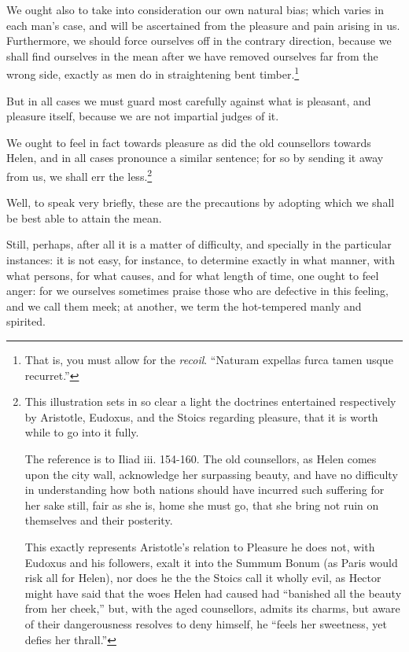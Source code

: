 We ought also to take into consideration our own natural bias; which varies in
each man’s case, and will be ascertained from the pleasure and pain
arising in us. Furthermore, we should force ourselves off in the contrary
direction, because we shall find ourselves in the mean after we have removed
ourselves far from the wrong side, exactly as men do in straightening bent
timber.\footnote{That is, you must allow for the \emph{recoil}. “Naturam expellas furca
tamen usque recurret.”}

But in all cases we must guard most carefully against what is pleasant, and
pleasure itself, because we are not impartial judges of it.

We ought to feel in fact towards pleasure as did the old counsellors towards
Helen, and in all cases pronounce a similar sentence; for so by sending it away
from us, we shall err the less.\footnote{This illustration sets in so clear a light the doctrines entertained
respectively by Aristotle, Eudoxus, and the Stoics regarding pleasure, that it
is worth while to go into it fully.

The reference is to Iliad iii. 154-160. The old counsellors, as Helen comes
upon the city wall, acknowledge her surpassing beauty, and have no difficulty
in understanding how both nations should have incurred such suffering for her
sake still, fair as she is, home she must go, that she bring not ruin on
themselves and their posterity.

This exactly represents Aristotle’s relation to Pleasure he does not,
with Eudoxus and his followers, exalt it into the Summum Bonum (as Paris would
risk all for Helen), nor does he the the Stoics call it wholly evil, as Hector
might have said that the woes Helen had caused had “banished all the
beauty from her cheek,” but, with the aged counsellors, admits its
charms, but aware of their dangerousness resolves to deny himself, he
“feels her sweetness, yet defies her thrall.”}

Well, to speak very briefly, these are the precautions by adopting which we
shall be best able to attain the mean.

Still, perhaps, after all it is a matter of difficulty, and specially in the
particular instances: it is not easy, for instance, to determine exactly in
what manner, with what persons, for what causes, and for what length of time,
one ought to feel anger: for we ourselves sometimes praise those who are
defective in this feeling, and we call them meek; at another, we term the
hot-tempered manly and spirited.

